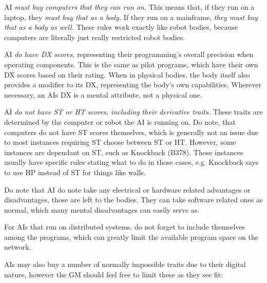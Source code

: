 \begin{multicols*}{3}
	AI \textit{must buy computers that they can run on.} This means that, if they run on a laptop, they \textit{must buy that as a body.} If they run on a mainframe, \textit{they must buy that as a body as well.} These rules work exactly like robot bodies, because computers are literally just really restricted robot bodies.
	
	AI \textit{do have DX scores}, representing their programming's overall precision when operating components. This is the same as pilot programs, which have their own DX scores based on their rating. When in physical bodies, the body itself also provides a modifier to its DX, representing the body's own capabilities. Wherever necessary, an AIs DX is a mental attribute, not a physical one.
	
	AI \textit{do not have ST or HT scores, including their derivative traits.} These traits are determined by the computer or robot the AI is running on. Do note, that computers do not have ST scores themselves, which is generally not an issue due to most instances requiring ST choose between ST or HT. However, some instances are dependant on ST, such as Knockback (B378). Those instances usually have specific rules stating what to do in those cases, e.g. Knockback says to use HP instead of ST for things like walls.
	
	Do note that AI do note take any electrical or hardware related advantages or disadvantages, those are left to the bodies. They can take software related ones as normal, which many mental disadvantages can easily serve as.
	
	For AIs that run on distributed systems, do not forget to include themselves among the programs, which can greatly limit the available program space on the network.
	
	AIs may also buy a number of normally impossible traits due to their digital nature, however the GM should feel free to limit these as they see fit:
	

\end{multicols*}
